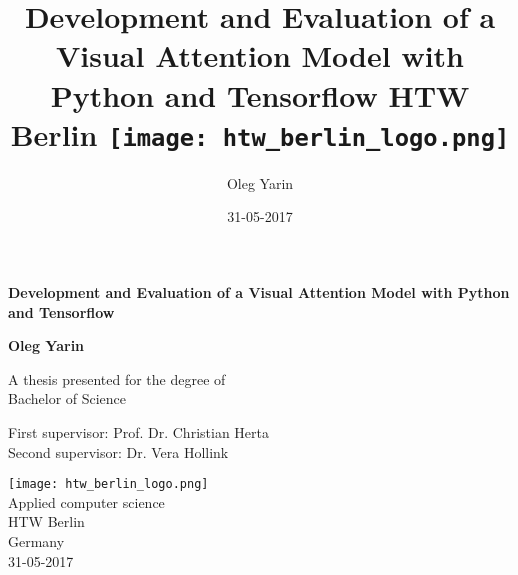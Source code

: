 
\title{
	{Development and Evaluation of a Visual Attention Model with Python and Tensorflow}
	{\large HTW Berlin}
	{\texttt{[image: htw\_berlin\_logo.png]}}
}
\author{Oleg Yarin}
\date{31-05-2017}


\begin{titlepage}
	\begin{center}
		\vspace*{1cm}

		\LARGE
		\textbf{Development and Evaluation of a Visual Attention Model with Python and Tensorflow}


		\vspace{1.0cm}
		\Large
		\textbf{Oleg Yarin}

		\vfill

		A thesis presented for the degree of\\
		Bachelor of Science

		\vspace{0.8cm}
		\normalsize
		First supervisor: Prof. Dr. Christian Herta \\
		Second supervisor: Dr. Vera Hollink
		\vspace{0.8cm}

		\texttt{[image: htw\_berlin\_logo.png]}\\
		\large
		Applied computer science\\
		HTW Berlin\\
		Germany\\
		31-05-2017

	\end{center}
\end{titlepage}
